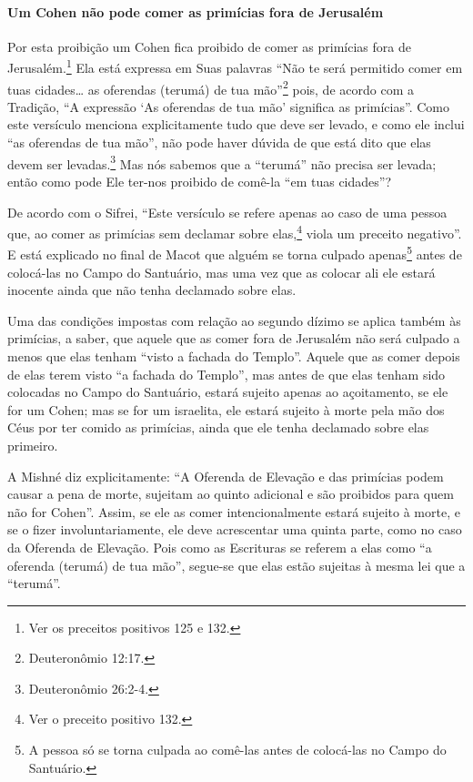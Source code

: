 \paragraph{Um Cohen não pode comer as primícias fora de Jerusalém}

Por esta proibição um Cohen fica proibido de comer as primícias fora
de Jerusalém.\footnote{Ver os preceitos positivos 125 e 132.} Ela está expressa em Suas palavras
``Não te será permitido comer em tuas cidades\ldots{} as oferendas (terumá)
de tua mão''\footnote{Deuteronômio 12:17.} pois, de acordo com a Tradição, ``A
expressão `As oferendas de tua mão' significa as primícias''. Como este
versículo menciona explicitamente tudo que deve ser levado, e como ele
inclui ``as oferendas de tua mão'', não pode haver dúvida de que está
dito que elas devem ser levadas.\footnote{Deuteronômio 26:2-4.} Mas nós sabemos
que a ``terumá'' não precisa ser levada; então como pode Ele ter-nos
proibido de comê-la ``em tuas cidades''?

De acordo com o Sifrei, ``Este versículo se refere apenas ao caso de uma
pessoa que, ao comer as primícias sem declamar sobre
elas,\footnote{Ver o preceito positivo 132.} viola um preceito negativo''. E está
explicado no final de Macot que alguém se torna culpado
apenas\footnote{A pessoa só se torna culpada ao comê-las antes de colocá-las no
Campo do Santuário.} antes de colocá-las no Campo do Santuário,
mas uma vez que as colocar ali ele estará inocente ainda que não tenha
declamado sobre elas.

Uma das condições impostas com relação ao segundo dízimo se aplica
também às primícias, a saber, que aquele que as comer fora de Jerusalém
não será culpado a menos que elas tenham ``visto a fachada do Templo''.
Aquele que as comer depois de elas terem visto ``a fachada do Templo'',
mas antes de que elas tenham sido colocadas no Campo do Santuário,
estará sujeito apenas ao açoitamento, se ele for um Cohen; mas se
for um israelita, ele estará sujeito à morte pela mão dos Céus por ter
comido as primícias, ainda que ele tenha declamado sobre elas primeiro.

A Mishné diz explicitamente: ``A Oferenda de Elevação e das primícias
podem causar a pena de morte, sujeitam ao quinto adicional e são
proibidos para quem não for Cohen''. Assim, se ele as comer
intencionalmente estará sujeito à morte, e se o fizer
involuntariamente, ele deve acrescentar uma quinta parte, como no caso
da Oferenda de Elevação. Pois como as Escrituras se referem a elas como
``a oferenda (terumá) de tua mão'', segue-se que elas estão sujeitas à
mesma lei que a ``terumá''.

